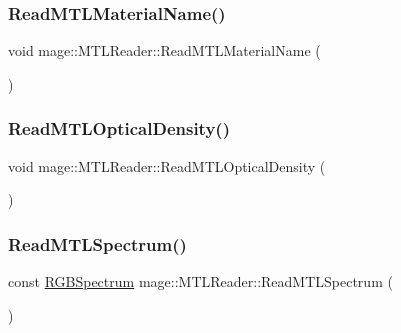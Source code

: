 \hypertarget{classmage_1_1_m_t_l_reader_a53494ca5e0f905b97227b21711a1686a}{}\label{classmage_1_1_m_t_l_reader_a53494ca5e0f905b97227b21711a1686a} 
\subsubsection{\texorpdfstring{Read\+M\+T\+L\+Material\+Name()}{ReadMTLMaterialName()}}
{\footnotesize\ttfamily void mage\+::\+M\+T\+L\+Reader\+::\+Read\+M\+T\+L\+Material\+Name (\begin{DoxyParamCaption}{ }\end{DoxyParamCaption})\hspace{0.3cm}{\ttfamily [private]}}

\hypertarget{classmage_1_1_m_t_l_reader_a06576927d764c9cd2be41871f137fac4}{}\label{classmage_1_1_m_t_l_reader_a06576927d764c9cd2be41871f137fac4} 
\subsubsection{\texorpdfstring{Read\+M\+T\+L\+Optical\+Density()}{ReadMTLOpticalDensity()}}
{\footnotesize\ttfamily void mage\+::\+M\+T\+L\+Reader\+::\+Read\+M\+T\+L\+Optical\+Density (\begin{DoxyParamCaption}{ }\end{DoxyParamCaption})\hspace{0.3cm}{\ttfamily [private]}}

\hypertarget{classmage_1_1_m_t_l_reader_a607a55ab2e68d3bc9b879d7e3377f0e3}{}\label{classmage_1_1_m_t_l_reader_a607a55ab2e68d3bc9b879d7e3377f0e3} 
\subsubsection{\texorpdfstring{Read\+M\+T\+L\+Spectrum()}{ReadMTLSpectrum()}}
{\footnotesize\ttfamily const \hyperlink{structmage_1_1_r_g_b_spectrum}{R\+G\+B\+Spectrum} mage\+::\+M\+T\+L\+Reader\+::\+Read\+M\+T\+L\+Spectrum (\begin{DoxyParamCaption}{ }\end{DoxyParamCaption})\hspace{0.3cm}{\ttfamily [private]}}

